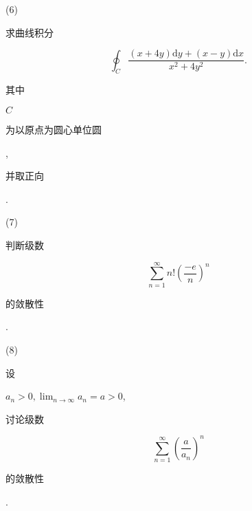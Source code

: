 \documentclass[10pt]{article}
\begin{document}
(6) \begin{CJK}{UTF8}{mj}求曲线积分\end{CJK}
$$
\oint_{C} \frac{(x+4 y) \mathrm{d} y+(x-y) \mathrm{d} x}{x^{2}+4 y^{2}} .
$$
\begin{CJK}{UTF8}{mj}其中\end{CJK} $C$ \begin{CJK}{UTF8}{mj}为以原点为圆心单位圆\end{CJK}, \begin{CJK}{UTF8}{mj}并取正向\end{CJK}.

(7) \begin{CJK}{UTF8}{mj}判断级数\end{CJK}
$$
\sum_{n=1}^{\infty} n !\left(\frac{-e}{n}\right)^{n}
$$
\begin{CJK}{UTF8}{mj}的敛散性\end{CJK}.

(8) \begin{CJK}{UTF8}{mj}设\end{CJK} $a_{n}>0, \lim _{n \rightarrow \infty} a_{n}=a>0$, \begin{CJK}{UTF8}{mj}讨论级数\end{CJK}
$$
\sum_{n=1}^{\infty}\left(\frac{a}{a_{n}}\right)^{n}
$$
\begin{CJK}{UTF8}{mj}的敛散性\end{CJK}.
\end{document}

